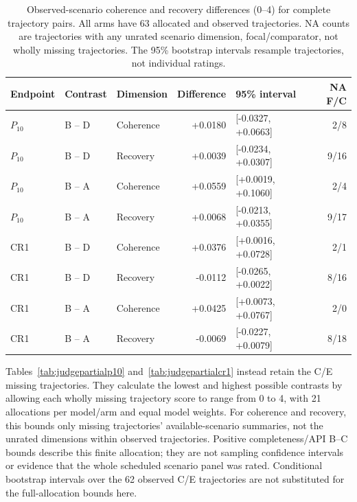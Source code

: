 \begin{table}[!htbp]
\centering\small
\caption{Observed-scenario coherence and recovery differences (0--4)
for complete trajectory pairs. All arms have 63 allocated and observed
trajectories. NA counts are trajectories with any unrated scenario
dimension, focal/comparator, not wholly missing trajectories. The 95\%
bootstrap intervals resample trajectories, not individual ratings.}\label{tab:judgeobservedcontrasts}

\begin{tabular*}{\textwidth}{@{\extracolsep{\fill}}lllrlr@{}}
\toprule
Endpoint & Contrast & Dimension & Difference & 95\% interval & NA F/C \\
\midrule
$P_{10}$ & B -- D & Coherence & +0.0180 & [-0.0327, +0.0663] & 2/8 \\
$P_{10}$ & B -- D & Recovery & +0.0039 & [-0.0234, +0.0307] & 9/16 \\
$P_{10}$ & B -- A & Coherence & +0.0559 & [+0.0019, +0.1060] & 2/4 \\
$P_{10}$ & B -- A & Recovery & +0.0068 & [-0.0213, +0.0355] & 9/17 \\
\midrule
CR1 & B -- D & Coherence & +0.0376 & [+0.0016, +0.0728] & 2/1 \\
CR1 & B -- D & Recovery & -0.0112 & [-0.0265, +0.0022] & 8/16 \\
CR1 & B -- A & Coherence & +0.0425 & [+0.0073, +0.0767] & 2/0 \\
CR1 & B -- A & Recovery & -0.0069 & [-0.0227, +0.0079] & 8/18 \\
\bottomrule
\end{tabular*}
\end{table}

Tables~\ref{tab:judgepartialp10} and~\ref{tab:judgepartialcr1} instead
retain the C/E missing trajectories. They calculate the lowest and highest possible contrasts by allowing
each wholly missing trajectory score to range from 0 to 4, with 21
allocations per model/arm and equal model weights. For coherence and recovery, this bounds only
missing trajectories' available-scenario summaries, not the unrated
dimensions within observed trajectories. Positive completeness/API B--C
bounds describe this finite allocation; they are not sampling confidence
intervals or evidence that the whole scheduled scenario panel was rated.
Conditional bootstrap intervals over the 62 observed C/E trajectories
are not substituted for the full-allocation bounds here.

